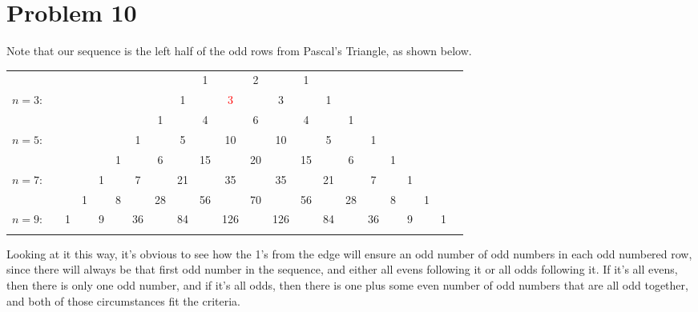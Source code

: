 \documentclass[11pt]{article}
\begin{document}
\newpage
\section*{Problem 10}
Note that our sequence is the left half of the odd rows from Pascal's Triangle, as shown below.
\begin{center}
\begin{tabular}{rccccccccccccccccccccc}
&    &    &    &    &    &    &    &    &  1 &    &  2 &    &  1\\\noalign{\smallskip\smallskip}
\color{red}$n=3$:&    &    &    &    &    &    &    &  1 &    &  \textcolor{red}{3} &    &  3 &    &  1\\\noalign{\smallskip\smallskip}
&    &    &    &    &    &    &  1 &    &  4 &    &  6 &    &  4 &    &  1\\\noalign{\smallskip\smallskip}
\color{red}$n=5$:&    &    &    &    &    &  1 &    &  \color{red}5 &    & \color{red}10 &    & 10 &    &  5 &    &  1\\\noalign{\smallskip\smallskip}
&    &    &    &    &  1 &    &  6 &    & 15 &    & 20 &    & 15 &    &  6 &    &  1\\\noalign{\smallskip\smallskip}
\color{red}$n=7$:&    &    &    &  1 &    &  \color{red}7 &    & \color{red}21 &    & \color{red}35 &    & 35 &    & 21 &    &  7 &    &  1\\\noalign{\smallskip\smallskip}
&    &    &  1 &    &  8 &    & 28 &    & 56 &    & 70 &    & 56 &    & 28 &    &  8 &    &  1\\\noalign{\smallskip\smallskip}
\color{red}$n=9$:&    &  1 &    &  \color{red}9 &    & \color{red}36 &    & \color{red}84 &    & \color{red}126 &    & 126 &    & 84 &    & 36 &    &  9 &    &  1\\\noalign{\smallskip\smallskip}
\end{tabular}
\end{center}

Looking at it this way, it's obvious to see how the 1's from the edge will ensure an odd number of odd numbers in each odd numbered row, since there will always be that first odd number in the sequence, and either all evens following it or all odds following it. If it's all evens, then there is only one odd number, and if it's all odds, then there is one plus some even number of odd numbers that are all odd together, and both of those circumstances fit the criteria.
\end{document}
